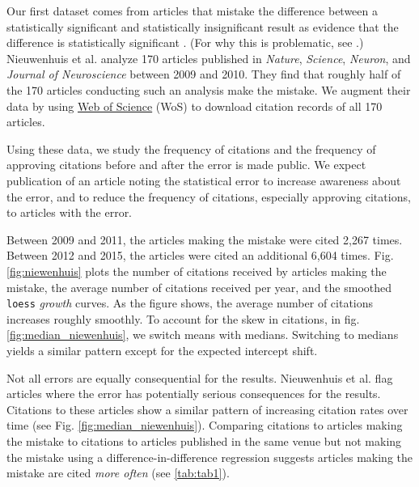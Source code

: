 \documentclass[12pt]{article}
\begin{document}
Our first dataset comes from articles that mistake the difference between a statistically significant and statistically insignificant result as evidence that the difference is statistically significant \cite{nieuwenhuis2011}. (For why this is problematic, see \cite{gelman2006}.) Nieuwenhuis et al. \cite{nieuwenhuis2011} analyze 170 articles published in \textit{Nature}, \textit{Science}, \textit{Neuron}, and \textit{Journal of Neuroscience} between 2009 and 2010. They find that roughly half of the 170 articles conducting such an analysis make the mistake. We augment their data by using \href{https://webofknowledge.com}{Web of Science} (WoS) \cite{reuters2012web} to download citation records of all 170 articles.

Using these data, we study the frequency of citations and the frequency of approving citations before and after the error is made public. We expect publication of an article noting the statistical error to increase awareness about the error, and to reduce the frequency of citations, especially approving citations, to articles with the error.

Between 2009 and 2011, the articles making the mistake were cited 2,267 times. Between 2012 and 2015, the articles were cited an additional 6,604 times. Fig. \ref{fig:niewenhuis} plots the number of citations received by articles making the mistake, the average number of citations received per year, and the smoothed \texttt{loess} \textit{growth} curves. As the figure shows, the average number of citations increases roughly smoothly. To account for the skew in citations, in fig. \ref{fig:median_niewenhuis}, we switch means with medians. Switching to medians yields a similar pattern except for the expected intercept shift.

Not all errors are equally consequential for the results. Nieuwenhuis et al. flag articles where the error has potentially serious consequences for the results. Citations to these articles show a similar pattern of increasing citation rates over time (see Fig. \ref{fig:median_niewenhuis}). Comparing citations to articles making the mistake to citations to articles published in the same venue but not making the mistake using a difference-in-difference regression suggests articles making the mistake are cited \textit{more often}  (see \ref{tab:tab1}).
\end{document}
